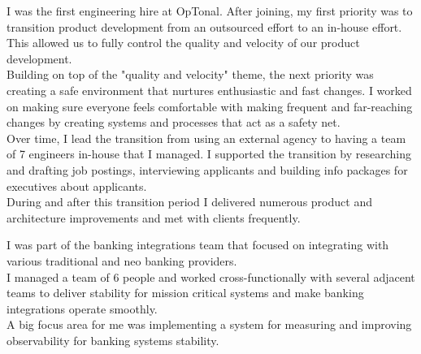 \documentclass[]{matija-resume}
\begin{document}
\begin{minipage}[t]{1.0\textwidth}
\vspace{\topsep}
I was the first engineering hire at OpTonal. After joining, my first priority was to transition product development from an outsourced effort to an in-house effort. This allowed us to fully control the quality and velocity of our product development.\\
\vspace{\topsep}
Building on top of the "quality and velocity" theme, the next priority was creating a safe environment that nurtures enthusiastic and fast changes. I worked on making sure everyone feels comfortable with making frequent and far-reaching changes by creating systems and processes that act as a safety net.\\
\vspace{\topsep}
Over time, I lead the transition from using an external agency to having a team of 7 engineers in-house that I managed. I supported the transition by researching and drafting job postings, interviewing applicants and building info packages for executives about applicants.\\
\vspace{\topsep}
During and after this transition period I delivered numerous product and architecture improvements and met with clients frequently.
\vspace{\topsep}

\sectionsep

\vspace{\topsep}
I was part of the banking integrations team that focused on integrating with various traditional and neo banking providers.\\
\vspace{\topsep}
I managed a team of 6 people and worked cross-functionally with several adjacent teams to deliver stability for mission critical systems and make banking integrations operate smoothly.\\
\vspace{\topsep}
A big focus area for me was implementing a system for measuring and improving observability for banking systems stability.
\sectionsep


\end{minipage}
\end{document}

